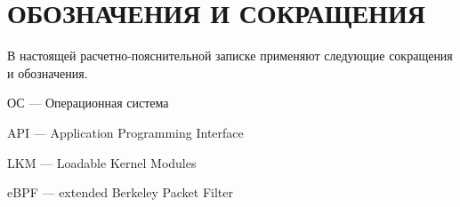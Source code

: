 \chapter*{ОБОЗНАЧЕНИЯ И СОКРАЩЕНИЯ}

В настоящей расчетно-пояснительной записке применяют следующие сокращения и обозначения.

\begin{description}[leftmargin=0pt]
	\item \noindent ОС --- Операционная система
	\item \noindent API --- Application Programming Interface
	\item \noindent LKM --- Loadable Kernel Modules
	\item \noindent eBPF --- extended Berkeley Packet Filter
\end{description}